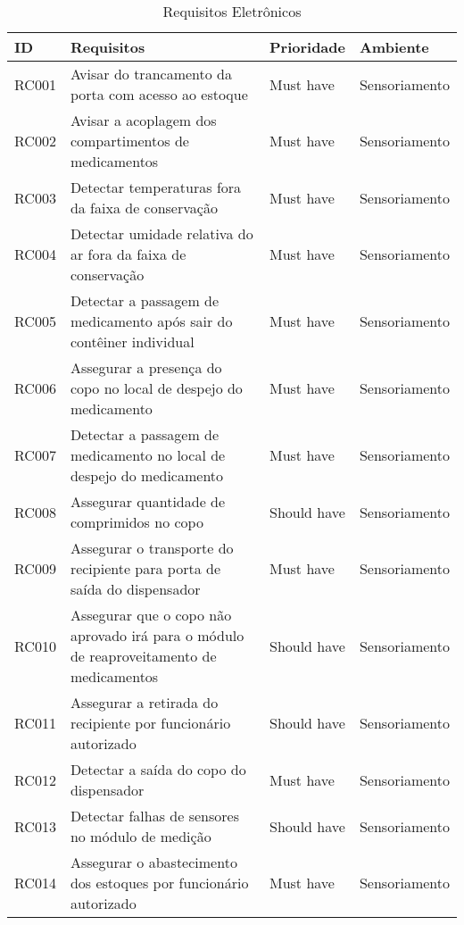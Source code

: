 \begin{table}[H]
    \centering
    \caption{Requisitos Eletrônicos}
    \label{tab:req_ele_sensor1}
	\begin{adjustbox}{max width = \textwidth}
        \begin{tabular}{|L{1.5cm}|L{8.5cm}|C{2.5cm}|C{3.5cm}|}
        \hline
        \textbf{ID} & \textbf{Requisitos} & \textbf{Prioridade} & \textbf{Ambiente} \\ \hline
        RC001 & Avisar do trancamento da porta com acesso ao estoque & Must have & Sensoriamento\\ \hline
        RC002 & Avisar a acoplagem dos compartimentos de medicamentos & Must have & Sensoriamento\\ \hline
        RC003 & Detectar temperaturas fora da faixa de conservação & Must have & Sensoriamento\\ \hline
        RC004 & Detectar umidade relativa do ar fora da faixa de conservação & Must have & Sensoriamento\\ \hline
        RC005 & Detectar a passagem de medicamento após sair do contêiner individual &  Must have & Sensoriamento\\ \hline
        RC006 & Assegurar a presença do copo no local de despejo do medicamento & Must have & Sensoriamento\\ \hline
        RC007 & Detectar a passagem de medicamento no local de despejo do medicamento & Must have & Sensoriamento\\ \hline
        RC008 & Assegurar quantidade de comprimidos no copo & Should have & Sensoriamento\\ \hline
        RC009 & Assegurar o transporte do recipiente para porta de saída do dispensador & Must have & Sensoriamento\\ \hline
        RC010 & Assegurar que o copo não aprovado irá para o módulo de reaproveitamento de medicamentos & Should have & Sensoriamento\\ \hline
        RC011 & Assegurar a retirada do recipiente por funcionário autorizado & Should have & Sensoriamento\\ \hline
        RC012 & Detectar a saída do copo do dispensador & Must have & Sensoriamento\\ \hline
        RC013 & Detectar falhas de sensores no módulo de medição & Should have & Sensoriamento\\ \hline
        RC014 & Assegurar o abastecimento dos estoques por funcionário autorizado & Must have & Sensoriamento\\ \hline

\end{tabular}
\end{adjustbox}
\end{table}
